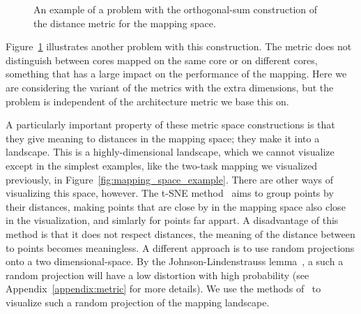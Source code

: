\begin{figure}[h]
	\centering
   \resizebox{0.85\textwidth}{!}{
	   \begin{tikzpicture}
	   
	   \end{tikzpicture}
	   }
	\caption{An example of a problem with the orthogonal-sum construction of the distance metric for the mapping space.}
	\label{fig:distance_tasks_problem}
\end{figure}

Figure~\ref{fig:distance_tasks_problem} illustrates another problem with this construction.
The metric does not distinguish between cores mapped on the same core or on different cores, something that has a large impact on the performance of the mapping.
Here we are considering the variant of the metrics with the extra dimensions, but the problem is independent of the architecture metric we base this on.

A particularly important property of these metric space constructions is that they give meaning to distances in the mapping space; they make it into a landscape.
This is a highly-dimensional landscape, which we cannot visualize except in the simplest examples, like the two-task mapping we visualized previously, in Figure~\ref{fig:mapping_space_example}.
There are other ways of visualizing this space, however.
The t-SNE method~\cite{tsne} aims to group points by their distances, making points that are close by in the mapping space also close in the visualization, and simlarly for points far appart.
A disadvantage of this method is that it does not respect distances, the meaning of the distance between to points becomes meaningless.
A different approach is to use random projections onto a two dimensional-space.
By the Johnson-Lindenstrauss lemma~\cite{johnson_lindenstrauss}, a such a random projection will have a low distortion with high probability (see Appendix~\ref{appendix:metric} for more details).
We use the methods of~\cite{visualloss} to visualize such a random projection of the mapping landscape.

